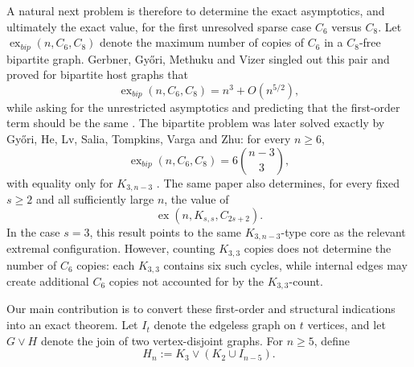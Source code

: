 \documentclass[11pt,letterpaper]{article}
\newcommand{\ex}{\operatorname{ex}}
\newcommand{\N}{\operatorname{N}}
\begin{document}
A natural next problem is therefore to determine the exact asymptotics, and ultimately the exact value, for the first unresolved sparse case $C_6$ versus $C_8$. Let $\ex_{bip}(n,C_6,C_8)$ denote the maximum number of copies of $C_6$ in a $C_8$-free bipartite graph. Gerbner, Gy\H{o}ri, Methuku and Vizer singled out this pair and proved for bipartite host graphs that
\[
  \ex_{bip}(n,C_6,C_8)=n^3+O(n^{5/2}),
\]
while asking for the unrestricted asymptotics and predicting that the first-order term should be the same \cite{GerbnerGyoriMethukuVizer2020}. The bipartite problem was later solved exactly by Gy\H{o}ri, He, Lv, Salia, Tompkins, Varga and Zhu: for every $n\ge 6$,
\[
  \ex_{bip}(n,C_6,C_8)=6\binom{n-3}{3},
\]
with equality only for $K_{3,n-3}$ \cite{GyoriHeLvSaliaTompkinsVargaZhu2025}. The same paper also determines, for every fixed $s\ge 2$ and all sufficiently large $n$, the value of
\[
  \ex(n,K_{s,s},C_{2s+2}).
\]
In the case $s=3$, this result points to the same $K_{3,n-3}$-type core as the relevant extremal configuration. However, counting $K_{3,3}$ copies does not determine the number of $C_6$ copies: each $K_{3,3}$ contains six such cycles, while internal edges may create additional $C_6$ copies not accounted for by the $K_{3,3}$-count.


Our main contribution is to convert these first-order and structural indications into an exact theorem. Let $I_t$ denote the edgeless graph on $t$ vertices, and let $G\vee H$ denote the join of two vertex-disjoint graphs. For $n\ge 5$, define
\[
  H_n:=K_3\vee (K_2\cup I_{n-5}).
\]
\end{document}

